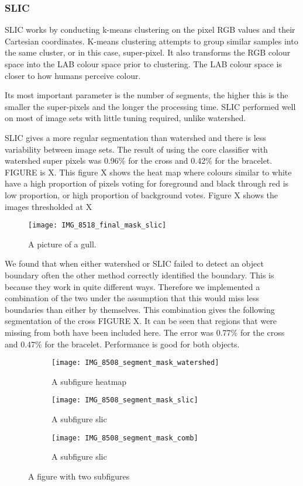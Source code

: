 \documentclass[12pt]{IIBproject}
\begin{document}
\subsubsection{SLIC}
SLIC works by conducting k-means clustering on the pixel RGB values and their Cartesian coordinates. K-means clustering attempts to group similar samples into the same cluster, or in this case, super-pixel. It also transforms the RGB colour space into the LAB colour space prior to clustering. The LAB colour space is closer to how humans perceive colour\cite{mcguire1992reporting}.

 Its most important parameter is the number of segments, the higher this is the smaller the super-pixels and the longer the processing time. SLIC performed well on most of image sets with little tuning required, unlike watershed. 
 
SLIC gives a more regular segmentation than watershed and there is less variability between image sets. The result of using the core classifier with watershed super pixels was 0.96\% for the cross and 0.42\% for the bracelet. FIGURE is X. This figure X shows the heat map where colours similar to white have a high proportion of pixels voting for foreground and black through red is low proportion, or high proportion of background votes. Figure X shows the images thresholded at X%
\begin{figure}[H]
  \caption{A picture of a gull.}
  \centering
    \texttt{[image: IMG\_8518\_final\_mask\_slic]}
\end{figure}
We found that when either watershed or SLIC failed to detect an object boundary  often the other method correctly identified the boundary. This is because they work in quite different ways. Therefore we implemented a combination of the two under the assumption that this would miss less boundaries than either by themselves. This combination gives the following segmentation of the cross FIGURE X. It can be seen that regions that were missing from both have been included here. The error was 0.77\% for the cross and 0.47\% for the bracelet. Performance is good for both objects. 

 \begin{figure}[H]
\centering
\begin{subfigure}{.5\textwidth}
  \centering
  \texttt{[image: IMG\_8508\_segment\_mask\_watershed]}
  \caption{A subfigure heatmap}
  \label{fig:sub2}
\end{subfigure}
\begin{subfigure}{.5\textwidth}
  \centering
  \texttt{[image: IMG\_8508\_segment\_mask\_slic]}
  \caption{A subfigure slic}
  \label{fig:sub1}
\end{subfigure}%
\begin{subfigure}{.5\textwidth}
  \centering
  \texttt{[image: IMG\_8508\_segment\_mask\_comb]}
  \caption{A subfigure slic}
  \label{fig:sub1}
\end{subfigure}%


\caption{A figure with two subfigures}
\label{fig:test}
\end{figure}
\end{document}
